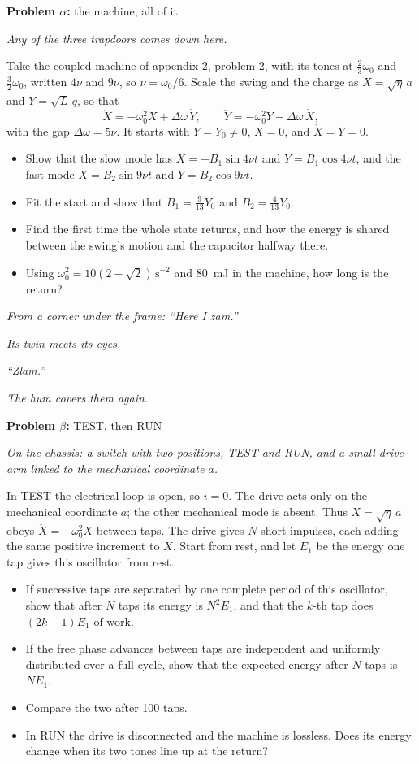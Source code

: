\documentclass[11pt]{article}
\newcommand{\scene}[1]{\par{\itshape #1}\par}
\newcommand{\problem}[2]{\par\medskip\textbf{Problem #1:} #2\par\nopagebreak}
\newenvironment{parts}{\begin{itemize}[leftmargin=3.4em,labelwidth=2.8em,labelsep=0.6em,align=left,itemsep=2pt,topsep=3pt]}{\end{itemize}}
\newcommand{\pt}[1]{\item[\textbf{#1}]}
\begin{document}
\problem{$\alpha$}{the machine, all of it}
\scene{Any of the three trapdoors comes down here.}
Take the coupled machine of appendix 2, problem 2, with its tones at $\frac23\omega_0$ and $\frac32\omega_0$, written $4\nu$ and $9\nu$, so $\nu = \omega_0/6$. Scale the swing and the charge as $X = \sqrt\eta\,a$ and $Y = \sqrt L\,q$, so that
\[ \ddot X = -\omega_0^2X + \Delta\omega\,\dot Y, \qquad \ddot Y = -\omega_0^2Y - \Delta\omega\,\dot X, \]
with the gap $\Delta\omega = 5\nu$. It starts with $Y = Y_0 \ne 0$, $X = 0$, and $\dot X = \dot Y = 0$.
\begin{parts}
\pt{$\alpha$-1} Show that the slow mode has $X = -B_1\sin 4\nu t$ and $Y = B_1\cos 4\nu t$, and the fast mode $X = B_2\sin 9\nu t$ and $Y = B_2\cos 9\nu t$.
\pt{$\alpha$-2} Fit the start and show that $B_1 = \frac{9}{13}Y_0$ and $B_2 = \frac{4}{13}Y_0$.
\pt{$\alpha$-3} Find the first time the whole state returns, and how the energy is shared between the swing's motion and the capacitor halfway there.
\pt{$\alpha$-4} Using $\omega_0^2 = 10(2 - \sqrt2)\,\mathrm{s^{-2}}$ and \SI{80}{mJ} in the machine, how long is the return?
\end{parts}
\scene{From a corner under the frame: ``Here I zam.''}
\scene{Its twin meets its eyes.}
\scene{``Zlam.''}
\scene{The hum covers them again.}

\problem{$\beta$}{TEST, then RUN}
\scene{On the chassis: a switch with two positions, TEST and RUN, and a small drive arm linked to the mechanical coordinate $a$.}
In TEST the electrical loop is open, so $i = 0$. The drive acts only on the mechanical coordinate $a$; the other mechanical mode is absent. Thus $X = \sqrt\eta\,a$ obeys $\ddot X = -\omega_0^2X$ between taps. The drive gives $N$ short impulses, each adding the same positive increment to $\dot X$. Start from rest, and let $E_1$ be the energy one tap gives this oscillator from rest.
\begin{parts}
\pt{$\beta$-1} If successive taps are separated by one complete period of this oscillator, show that after $N$ taps its energy is $N^2E_1$, and that the $k$-th tap does $(2k - 1)E_1$ of work.
\pt{$\beta$-2} If the free phase advances between taps are independent and uniformly distributed over a full cycle, show that the expected energy after $N$ taps is $NE_1$.
\pt{$\beta$-3} Compare the two after 100 taps.
\pt{$\beta$-4} In RUN the drive is disconnected and the machine is lossless. Does its energy change when its two tones line up at the return?
\end{parts}
\end{document}
